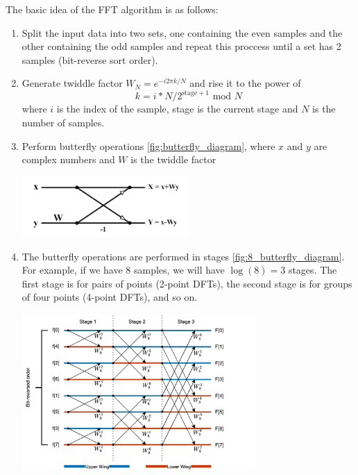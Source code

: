 The basic idea of the FFT algorithm is as follows:
\begin{enumerate}
    \item Split the input data into two sets, one containing the even samples and the other containing the odd samples and repeat this proccess until a set has 2 samples (bit-reverse sort order).
    \item Generate twiddle factor $W_N = e^{-i 2 \pi k / N}$ and rise it to the power of \\
    \begin{equation}
        k = i * N / 2^{\text{stage} + 1} \text{ mod } N
    \end{equation}
    where $i$ is the index of the sample, stage is the current stage and $N$ is the number of samples.
    \item Perform butterfly operations \ref{fig:butterfly_diagram}, where $x$ and $y$ are complex numbers and $W$ is the twiddle factor
    \begin{minipage}{1\textwidth}
        \centering
        \includegraphics[width=0.5\textwidth]{"images/butterfly_diagram.png"}
        \label{fig:butterfly_diagram}
    \end{minipage}
    \item The butterfly operations are performed in stages \ref{fig:8_butterfly_diagram}. For example, if we have 8 samples, we will have $\log(8) = 3 $ stages. The first stage is for pairs of points (2-point DFTs), the second stage is for groups of four points (4-point DFTs), and so on.
    \begin{minipage}{1\textwidth}
        \centering
        \includegraphics[width=0.7\textwidth]{"images/8_butterfly_diagram.png"}
        \label{fig:8_butterfly_diagram}
    \end{minipage}
\end{enumerate}




